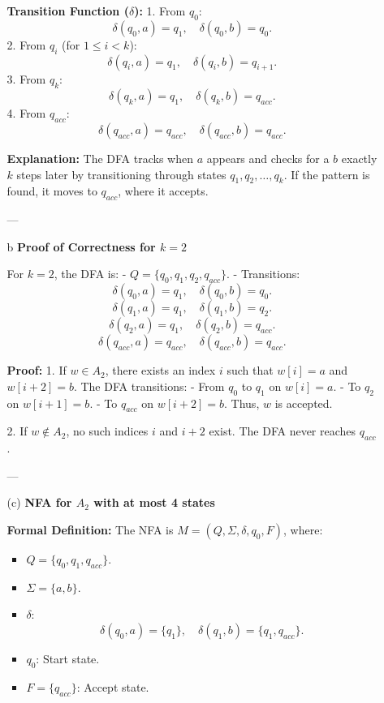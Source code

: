 \documentclass[9pt,tikz,border=2mm]{article}
\begin{document}
\begin{enumerate}
\begin{enumerate}
\textbf{Transition Function (\( \delta \)):}  
1. From \( q_0 \):
   \[
   \delta(q_0, a) = q_1, \quad \delta(q_0, b) = q_0.
   \]
2. From \( q_i \) (for \( 1 \leq i < k \)):
   \[
   \delta(q_i, a) = q_1, \quad \delta(q_i, b) = q_{i+1}.
   \]
3. From \( q_k \):
   \[
   \delta(q_k, a) = q_1, \quad \delta(q_k, b) = q_{acc}.
   \]
4. From \( q_{acc} \):
   \[
   \delta(q_{acc}, a) = q_{acc}, \quad \delta(q_{acc}, b) = q_{acc}.
   \]

\textbf{Explanation:}  
The DFA tracks when \( a \) appears and checks for a \( b \) exactly \( k \) steps later by transitioning through states \( q_1, q_2, \ldots, q_k \). If the pattern is found, it moves to \( q_{acc} \), where it accepts.

---

\item[b] \textbf{ Proof of Correctness for \( k = 2 \)}

For \( k = 2 \), the DFA is:
- \( Q = \{q_0, q_1, q_2, q_{acc}\} \).
- Transitions:
  \[
  \delta(q_0, a) = q_1, \quad \delta(q_0, b) = q_0.
  \]
  \[
  \delta(q_1, a) = q_1, \quad \delta(q_1, b) = q_2.
  \]
  \[
  \delta(q_2, a) = q_1, \quad \delta(q_2, b) = q_{acc}.
  \]
  \[
  \delta(q_{acc}, a) = q_{acc}, \quad \delta(q_{acc}, b) = q_{acc}.
  \]

\textbf{Proof:}
1. If \( w \in A_2 \), there exists an index \( i \) such that \( w[i] = a \) and \( w[i+2] = b \). The DFA transitions:
   - From \( q_0 \) to \( q_1 \) on \( w[i] = a \).
   - To \( q_2 \) on \( w[i+1] = b \).
   - To \( q_{acc} \) on \( w[i+2] = b \).
   Thus, \( w \) is accepted.

2. If \( w \notin A_2 \), no such indices \( i \) and \( i+2 \) exist. The DFA never reaches \( q_{acc} \).

---

\item[(c)] \textbf{ NFA for \( A_2 \) with at most 4 states}

\textbf{Formal Definition:}  
The NFA is \( M = (Q, \Sigma, \delta, q_0, F) \), where:
\begin{itemize}
    \item \( Q = \{q_0, q_1, q_{acc}\} \).
    \item \( \Sigma = \{a, b\} \).
    \item \( \delta \):
    \[
    \delta(q_0, a) = \{q_1\}, \quad \delta(q_1, b) = \{q_1, q_{acc}\}.
    \]
    \item \( q_0 \): Start state.
    \item \( F = \{q_{acc}\} \): Accept state.
\end{itemize}


\end{enumerate}
\end{enumerate}
\end{document}
